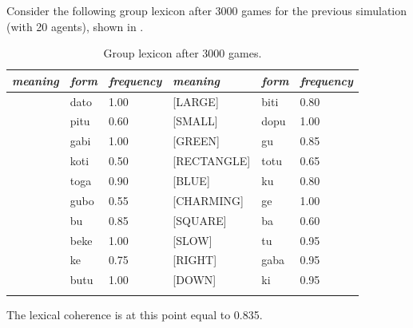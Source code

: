 Consider the following group lexicon after 3000 games for the
previous simulation (with 20 agents), shown in . 
\begin{table}
\begin{center}
\begin{tabular}{l  l  l  l  l  l }
\lsptoprule 
{\it meaning} & {\it form} & {\it frequency} & {\it meaning} & {\it form} & {\it frequency} \\ \midrule
[DARK]& dato & 1.00 & [LARGE]& biti & 0.80 \\ \midrule 
[LIGHT]& pitu & 0.60 & [SMALL]& dopu & 1.00 \\ \midrule 
[RED]& gabi & 1.00 & [GREEN]& gu & 0.85 \\ \midrule 
[SQUARE]& koti & 0.50 & [RECTANGLE]& totu & 0.65 \\ \midrule 
[LEFT]& toga & 0.90 & [BLUE]& ku & 0.80 \\ \midrule 
[YELLOW]& gubo & 0.55 & [CHARMING]& ge & 1.00 \\ \midrule 
[TRIANGLE]& bu & 0.85 & [SQUARE]& ba & 0.60 \\ \midrule 
[FAST]& beke & 1.00 & [SLOW]& tu & 0.95 \\ \midrule 
[CIRCLE]& ke & 0.75 & [RIGHT]& gaba & 0.95 \\ \midrule 
[UP]& butu & 1.00 & [DOWN]& ki & 0.95 \\ \midrule 
\lspbottomrule
\end{tabular}
\caption{\label{tab:t-mem3000} Group lexicon after 3000 games.}
\end{center}
\end{table}
The lexical coherence is at this point equal to 0.835. 

